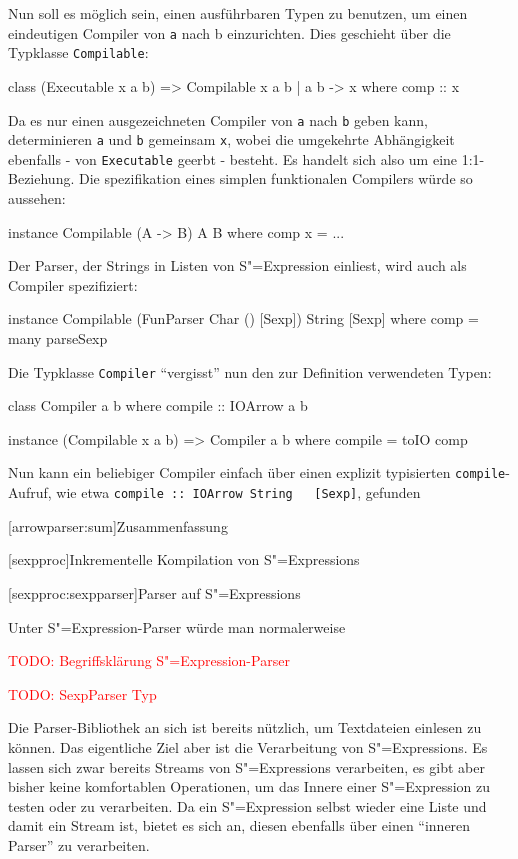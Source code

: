 \documentclass[11pt, a4paper, bibgerm]{book}
\newcommand\icode[1]{\lstinline?#1?}
\newcommand{\todo}[1]{
  \textcolor{red}{TODO: #1}
}
\newcommand\lchapter{}
\newcommand\lsection{}
\newcommand{\sexp}{S"=Expression}
\newcommand{\sexps}{S"=Expressions}
\begin{document}
Nun soll es möglich sein, einen ausführbaren Typen zu benutzen, um einen
eindeutigen Compiler von \icode{a} nach {b} einzurichten. Dies geschieht
über die Typklasse \icode{Compilable}:
\begin{code}
class (Executable x a b) => Compilable x a b | a b -> x where
  comp :: x
\end{code}
Da es nur einen ausgezeichneten Compiler von \icode{a} nach \icode{b}
geben kann, determinieren \icode{a} und \icode{b} gemeinsam \icode{x},
wobei die umgekehrte Abhängigkeit ebenfalls - von \icode{Executable}
geerbt - besteht. Es handelt sich also um eine 1:1-Beziehung. Die
spezifikation eines simplen funktionalen Compilers würde so aussehen:
\begin{code}
instance Compilable (A -> B) A B where
  comp x = ...
\end{code}
Der Parser, der Strings in Listen von \sexp{} einliest, wird auch als
Compiler spezifiziert:
\begin{code}
instance Compilable (FunParser Char () [Sexp]) String [Sexp] where
  comp = many parseSexp
\end{code}
Die Typklasse \icode{Compiler} "`vergisst"' nun den zur Definition
verwendeten Typen:
\begin{code}
class Compiler a b where
  compile :: IOArrow a b

instance (Compilable x a b) => Compiler a b where
  compile = toIO comp
\end{code}
Nun kann ein beliebiger Compiler einfach über einen explizit typisierten
\icode{compile}-Aufruf, wie etwa \icode{compile :: IOArrow String
  [Sexp]}, gefunden

\lsection[arrowparser:sum]{Zusammenfassung}

\lchapter[sexpproc]{Inkrementelle Kompilation von \sexps{}}

\lsection[sexpproc:sexpparser]{Parser auf \sexps}

Unter \sexp{}-Parser würde man normalerweise 

\todo{Begriffsklärung \sexp{}-Parser}

\todo{SexpParser Typ}

Die Parser-Bibliothek an sich ist bereits nützlich, um Textdateien
einlesen zu können. Das eigentliche Ziel aber ist die Verarbeitung von
\sexps{}. Es lassen sich zwar bereits Streams von \sexps{} verarbeiten,
es gibt aber bisher keine komfortablen Operationen, um das Innere einer
\sexp{} zu testen oder zu verarbeiten. Da ein \sexp{} selbst wieder eine
Liste und damit ein Stream ist, bietet es sich an, diesen ebenfalls über
einen "`inneren Parser"' zu verarbeiten.
\end{document}
